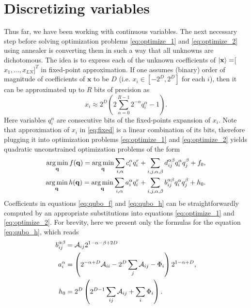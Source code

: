 \section{Discretizing variables}
Thus far, we have been working with continuous variables. The next necessary
step before solving optimization problems \eqref{eq:optimize_1} and
\eqref{eq:optimize_2} using annealer is converting them in such a way that all
unknowns are dichotomous. The idea is to express each of the unknown
coefficients of $\ket{\mathbf{x}} = $[$x_1, \ldots, x_{LN}]^T$ in fixed-point
approximation. If one assumes (binary) order of magnitude of coefficients of
$\mathbf x$ to be $D$ (i.e. $x_i \in [-2^D, 2^D]$ for each $i$), then it can be
approximated up to $R$ bits of precision as
\begin{equation}
  \label{eq:fixed}
  x_i \approx 2^D \left(2 \sum_{\alpha=0}^{R-1}2^{-\alpha}q_i^{\alpha} -1\right).
\end{equation}
Here variables $q_i^\alpha$ are consecutive bits of the fixed-points expansion
of $x_i$. Note that approximation of $x_i$ in \eqref{eq:fixed} is a linear
combination of its bits, therefore plugging it into optimization problems
\eqref{eq:optimize_1} and \eqref{eq:optimize_2} yields quadratic unconstrained
optimization problems of the form
\begin{align}
  \label{eq:qubo_f}
  \operatorname*{arg\,min}_{\mathbf{q}} f(\mathbf{q}) = \operatorname*{arg\,min}_{\mathbf{q}} \sum_{i,\alpha} c_i^{\alpha} q_i^r + \sum_{i,j,\alpha,\beta} d_{ij}^{\alpha\beta} q_i^{\alpha} q_j^{\beta} + f_0, \\
  \label{eq:qubo_h}
  \operatorname*{arg\,min}_{\mathbf{q}} h(\mathbf{q}) = \operatorname*{arg\,min}_{\mathbf{q}} \sum_{i,\alpha} a_i^{\alpha} q_i^r + \sum_{i,j,\alpha,\beta} b_{ij}^{\alpha\beta} q_i^{\alpha} q_j^{\beta} + h_0.
\end{align}
Coefficients in equations \eqref{eq:qubo_f} and \eqref{eq:qubo_h} can be
straightforwardly computed by an appropriate substitutions into equations
\eqref{eq:optimize_1} and \eqref{eq:optimize_2}. For brevity, here we present
only the formulas for the equation \eqref{eq:qubo_h}, which reads
\begin{eqnarray}
  \begin{split}
    b_{ij}^{\alpha\beta} &= \mathcal{A}_{ij} 2^{1-\alpha-\beta+2D} \\
    a_i^\alpha &= \left( 2^{-\alpha+D}\mathcal{A}_{ii} - 2^D\sum_{j}\mathcal{A}_{ij}- \Phi_i\right)2^{1-\alpha+D},
    \\
    h_0 &= 2^D\left( 2^{D-1}\sum_{ij}\mathcal{A}_{ij}+\sum_i \Phi_i\right).
  \end{split}
  \label{eq:coeff}
\end{eqnarray}

